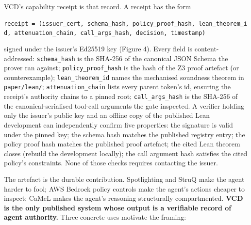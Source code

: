 VCD's capability receipt is that record. A receipt has the form

\texttt{receipt\ =\ (issuer\_cert,\ schema\_hash,\ policy\_proof\_hash,\ lean\_theorem\_id,\ attenuation\_chain,\ call\_args\_hash,\ decision,\ timestamp)}

signed under the issuer's Ed25519 key (Figure 4). Every field is
content-addressed: \texttt{schema\_hash} is the SHA-256 of the canonical
JSON Schema the prover ran against; \texttt{policy\_proof\_hash} is the
hash of the Z3 proof artefact (or counterexample);
\texttt{lean\_theorem\_id} names the mechanised soundness theorem in
\texttt{paper/lean/}; \texttt{attenuation\_chain} lists every parent
token's id, ensuring the receipt's authority chains to a pinned root;
\texttt{call\_args\_hash} is the SHA-256 of the canonical-serialised
tool-call arguments the gate inspected. A verifier holding only the
issuer's public key and an offline copy of the published Lean
development can independently confirm five properties: the signature is
valid under the pinned key; the schema hash matches the published
registry entry; the policy proof hash matches the published proof
artefact; the cited Lean theorem closes (rebuild the development
locally); the call argument hash satisfies the cited policy's
constraints. None of those checks requires contacting the issuer.

The artefact is the durable contribution. Spotlighting and StruQ make
the agent harder to fool; AWS Bedrock policy controls make the agent's
actions cheaper to inspect; CaMeL makes the agent's reasoning
structurally compartmented. \textbf{VCD is the only published system
whose output is a verifiable record of agent authority.} Three concrete
uses motivate the framing:

